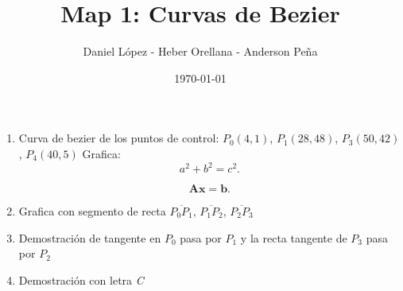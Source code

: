 \documentclass[11pt]{article}
\begin{document}
\author{Daniel López - Heber Orellana - Anderson Peña} \date{\today}
\title{Map 1: Curvas de Bezier}
\maketitle

\medskip

\begin{enumerate}

\item
Curva de bezier de los puntos de control: $P_0(4,1)$, $P_1(28,48)$, $P_3(50,42)$, $P_4(40,5)$
Grafica:
\begin{equation}
    a^2 + b^2 = c^2.
\end{equation}


\begin{equation}
    \mathbf{A} \mathbf{x} = \mathbf{b}.
\end{equation}

\item
Grafica con segmento de recta $\overline{P_0 P_1}$, $\overline{P_1 P_2}$, $\overline{P_2 P_3}$

\item
Demostración de tangente en $P_0$ pasa por $P_1$ y la recta tangente de  $P_3$ pasa por $P_2$

\item 
Demostración con letra \emph{C}
\end{enumerate}
\end{document}
